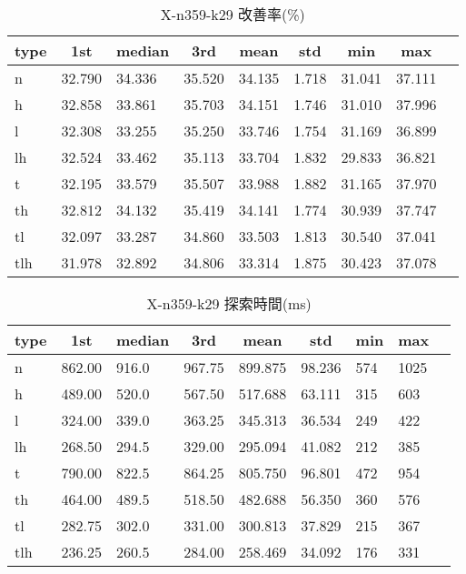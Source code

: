 \begin{table}[htbp]
    \centering
    \caption{X-n359-k29 改善率(\%)}
    \begin{tabular}{|l|l|l|l|l|l|l|l|l|}\hline
    \multicolumn{1}{|c|}{\textbf{type}}
    &\multicolumn{1}{|c|}{\textbf{1st}}
    &\multicolumn{1}{c|}{\textbf{median}}
    &\multicolumn{1}{c|}{\textbf{3rd}}
    &\multicolumn{1}{c|}{\textbf{mean}}
    &\multicolumn{1}{c|}{\textbf{std}}
    &\multicolumn{1}{c|}{\textbf{min}}
    &\multicolumn{1}{c|}{\textbf{max}}\\\hline
	n & 32.790 & 34.336 & 35.520 & 34.135 & 1.718 & 31.041 & 37.111\\\hline
	h & 32.858 & 33.861 & 35.703 & 34.151 & 1.746 & 31.010 & 37.996\\\hline
	l & 32.308 & 33.255 & 35.250 & 33.746 & 1.754 & 31.169 & 36.899\\\hline
	lh & 32.524 & 33.462 & 35.113 & 33.704 & 1.832 & 29.833 & 36.821\\\hline
	t & 32.195 & 33.579 & 35.507 & 33.988 & 1.882 & 31.165 & 37.970\\\hline
	th & 32.812 & 34.132 & 35.419 & 34.141 & 1.774 & 30.939 & 37.747\\\hline
	tl & 32.097 & 33.287 & 34.860 & 33.503 & 1.813 & 30.540 & 37.041\\\hline
	tlh & 31.978 & 32.892 & 34.806 & 33.314 & 1.875 & 30.423 & 37.078\\\hline
	\end{tabular}
\end{table}
\begin{table}[htbp]
    \centering
    \caption{X-n359-k29 探索時間(ms)}
    \begin{tabular}{|l|l|l|l|l|l|l|l|l|}\hline
    \multicolumn{1}{|c|}{\textbf{type}}
    &\multicolumn{1}{|c|}{\textbf{1st}}
    &\multicolumn{1}{c|}{\textbf{median}}
    &\multicolumn{1}{c|}{\textbf{3rd}}
    &\multicolumn{1}{c|}{\textbf{mean}}
    &\multicolumn{1}{c|}{\textbf{std}}
    &\multicolumn{1}{c|}{\textbf{min}}
    &\multicolumn{1}{c|}{\textbf{max}}\\\hline
	n & 862.00 & 916.0 & 967.75 & 899.875 & 98.236 & 574 & 1025\\\hline
	h & 489.00 & 520.0 & 567.50 & 517.688 & 63.111 & 315 & 603\\\hline
	l & 324.00 & 339.0 & 363.25 & 345.313 & 36.534 & 249 & 422\\\hline
	lh & 268.50 & 294.5 & 329.00 & 295.094 & 41.082 & 212 & 385\\\hline
	t & 790.00 & 822.5 & 864.25 & 805.750 & 96.801 & 472 & 954\\\hline
	th & 464.00 & 489.5 & 518.50 & 482.688 & 56.350 & 360 & 576\\\hline
	tl & 282.75 & 302.0 & 331.00 & 300.813 & 37.829 & 215 & 367\\\hline
	tlh & 236.25 & 260.5 & 284.00 & 258.469 & 34.092 & 176 & 331\\\hline
	\end{tabular}
\end{table}
